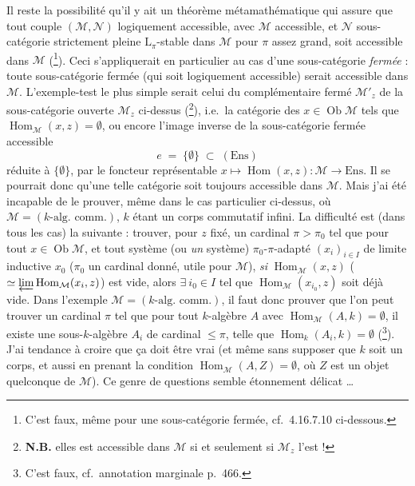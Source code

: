 \documentclass[11pt]{article}
\newcommand{\printedpage}[1]{\marginpar{\footnotesize p.~#1}}
\newcommand{\msp}[1]{\marginpar{\footnotesize [#1]}}
\newcommand{\Ob}{\operatorname{Ob}}
\newcommand{\Hom}{\operatorname{Hom}}
\newcommand{\Ens}{\mathrm{Ens}}
\begin{document}
Il reste la possibilité qu'il y ait un théorème métamathématique qui assure que tout couple $(\mathcal{M},\mathcal{N})$ logiquement accessible, avec $\mathcal{M}$ accessible, et $\mathcal{N}$ sous-catégorie strictement pleine $\mathrm{L}_\pi$-stable dans $\mathcal{M}$ pour $\pi$ assez grand, soit accessible dans $\mathcal{M}$ (\footnote[188]{C'est faux, même pour une sous-catégorie fermée, cf.\ 4.16.7.10 ci-dessous.}). Ceci s'appliquerait en particulier au cas d'une sous-catégorie \textit{fermée} : toute sous-catégorie fermée (qui soit logiquement accessible) serait accessible dans $\mathcal{M}$. L'exemple-test le plus simple serait celui du complémentaire fermé $\mathcal{M}'_z$ de la sous-catégorie ouverte $\mathcal{M}_z$ ci-dessus (\footnote[189]{\textbf{N.B.} elles est accessible dans $\mathcal{M}$ si et seulement si $\mathcal{M}_z$ l'est ! %
}), i.e.\ la catégorie des $x \in \Ob\mathcal{M}$ tels que $\Hom_{\mathcal{M}}(x,z) = \emptyset$, ou encore
\msp{467}
l'image inverse de la sous-catégorie fermée accessible
\[
e \;=\; \{\emptyset\} \;\subset\; (\Ens)
\]
réduite à $\{\emptyset\}$, par le foncteur représentable $x \longmapsto \Hom(x,z) : \mathcal{M} \longrightarrow \Ens$. Il se pourrait donc qu'une telle catégorie soit toujours accessible dans $\mathcal{M}$. Mais j'ai été incapable de le
\printedpage{181}
prouver, même dans le cas particulier ci-dessus, où $\mathcal{M} = (k\text{-alg.\ comm.})$, $k$ étant un corps commutatif infini. La difficulté est (dans tous les cas) la suivante : trouver, pour $z$ fixé, un cardinal $\pi > \pi_0$ tel que pour tout $x \in \Ob\mathcal{M}$, et tout système (ou \textit{un} système) $\pi_0$-$\pi$-adapté $(x_i)_{i\in I}$ de limite inductive $x_0$ ($\pi_0$ un cardinal donné, utile pour $\mathcal{M}$), \textit{si} $\Hom_{\mathcal{M}}(x,z)$ ($\simeq \varprojlim \Hom_{\mathcal{M}}(x_i,z)$) est vide, alors $\exists\ i_0 \in I$ tel que $\Hom_{\mathcal{M}}(x_{i_0},z)$ soit déjà vide. Dans l'exemple $\mathcal{M} = (k\text{-alg.\ comm.})$, il faut donc prouver que l'on peut trouver un cardinal $\pi$
tel que pour tout $k$-algèbre $A$ avec $\Hom_{\mathcal{M}}(A,k) = \emptyset$, il existe une sous-$k$-algèbre $A_i$ de %
cardinal $\leqslant \pi$, telle que $\Hom_k(A_i,k) = \emptyset$ (\footnote[190]{C'est faux, cf.\ annotation marginale p.~466.}). J'ai tendance à croire que ça doit être vrai (et même sans
\msp{468}
supposer que $k$ soit un corps, et aussi en prenant la condition $\Hom_{\mathcal{M}}(A,Z) = \emptyset$, où $Z$ est un objet quelconque de $\mathcal{M}$). Ce genre de questions semble étonnement délicat \dots %
\end{document}

